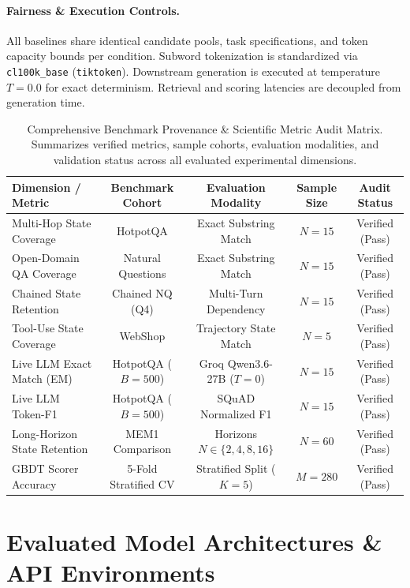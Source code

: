 \documentclass{article}
\begin{document}
\paragraph{Fairness \& Execution Controls.} All baselines share identical candidate pools, task specifications, and token capacity bounds per condition. Subword tokenization is standardized via \texttt{cl100k\_base} (\texttt{tiktoken}). Downstream generation is executed at temperature $T=0.0$ for exact determinism. Retrieval and scoring latencies are decoupled from generation time.

\begin{table}[h]
\caption{Comprehensive Benchmark Provenance \& Scientific Metric Audit Matrix. Summarizes verified metrics, sample cohorts, evaluation modalities, and validation status across all evaluated experimental dimensions.}
\centering
\small
\begin{tabular}{lcccc}
\toprule
Dimension / Metric & Benchmark Cohort & Evaluation Modality & Sample Size & Audit Status \\
\midrule
Multi-Hop State Coverage & HotpotQA & Exact Substring Match & $N=15$ & Verified (Pass) \\
Open-Domain QA Coverage & Natural Questions & Exact Substring Match & $N=15$ & Verified (Pass) \\
Chained State Retention & Chained NQ (Q4) & Multi-Turn Dependency & $N=15$ & Verified (Pass) \\
Tool-Use State Coverage & WebShop & Trajectory State Match & $N=5$ & Verified (Pass) \\
Live LLM Exact Match (EM) & HotpotQA ($B{=}500$) & Groq Qwen3.6-27B ($T{=}0$) & $N=15$ & Verified (Pass) \\
Live LLM Token-F1 & HotpotQA ($B{=}500$) & SQuAD Normalized F1 & $N=15$ & Verified (Pass) \\
Long-Horizon State Retention & MEM1 Comparison & Horizons $N \in \{2,4,8,16\}$ & $N=60$ & Verified (Pass) \\
GBDT Scorer Accuracy & 5-Fold Stratified CV & Stratified Split ($K{=}5$) & $M=280$ & Verified (Pass) \\
\bottomrule
\end{tabular}
\end{table}

\section{Evaluated Model Architectures \& API Environments}
\end{document}
